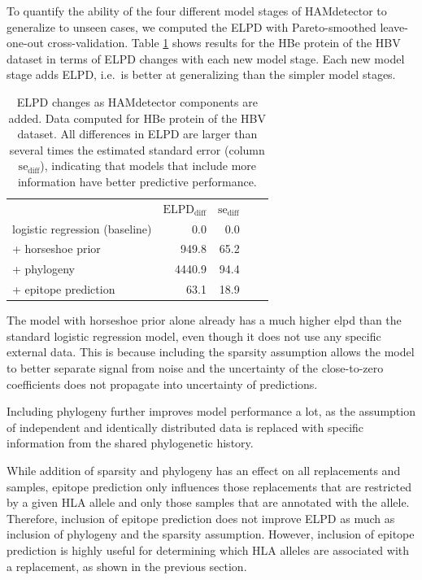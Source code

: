 \documentclass{bioinfo}
\begin{document}
To quantify the ability of the four different model stages of HAMdetector to generalize to unseen cases, we computed the ELPD with Pareto-smoothed leave-one-out cross-validation. Table \ref{loo} shows results for the HBe protein of the HBV dataset in terms of ELPD changes with each new model stage. Each new model stage adds ELPD, i.e.\ is better at generalizing than the simpler model stages.

\begin{table}[h!]
  \renewcommand{\arraystretch}{1.3}
  \centering
  \caption{ELPD changes as HAMdetector components are added. Data computed for HBe protein of the HBV dataset. All differences in ELPD are larger than several times the estimated standard error (column \(\text{se}_\text{diff}\)), indicating that models that include more information have better predictive performance.}
  \vspace{0.5cm}
  \begin{tabular}{l|r|rll}
  \multicolumn{1}{l|}{} & \multicolumn{1}{c|}{\(\text{ELPD}_\text{diff}\)} & \multicolumn{1}{c}{\(\text{se}_\text{diff}\)} &  &  \\ \cline{1-3}
  logistic regression (baseline) & 0.0  & 0.0 &  &  \\
  + horseshoe prior     & 949.8  & 65.2 &  &  \\
  + phylogeny & 4440.9 & 94.4 &  &  \\
  + epitope prediction & 63.1   & 18.9 &  & 
  \end{tabular}
  \label{loo}
\end{table}


The model with horseshoe prior alone already has a much higher elpd than the standard logistic regression model, even though it does not use any specific external data. This is because including the sparsity assumption allows the model to better separate signal from noise and the uncertainty of the close-to-zero coefficients does not propagate into uncertainty of predictions.

Including phylogeny further improves model performance a lot, as the assumption of independent and identically distributed data is replaced with specific information from the shared phylogenetic history.

While addition of sparsity and phylogeny has an effect on all replacements and samples, epitope prediction only influences those replacements that are restricted by a given HLA allele and only those samples that are annotated with the allele. Therefore, inclusion of epitope prediction does not improve ELPD as much as inclusion of phylogeny and the sparsity assumption. However, inclusion of epitope prediction is highly useful for determining which HLA alleles are associated with a replacement, as shown in the previous section.
\end{document}
